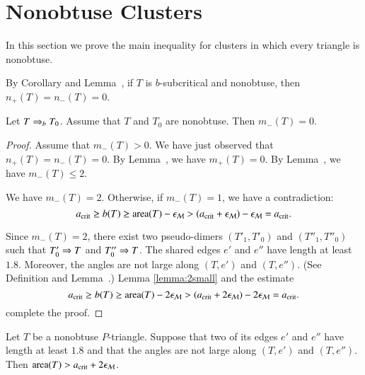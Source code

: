 \section{Nonobtuse Clusters}

In this section we prove the main inequality for clusters in which every
triangle is nonobtuse.

By Corollary  and Lemma~, 
if $T$ is $b$-subcritical and nonobtuse, then $n_+(T)=n_-(T)=0$.


\begin{lemma} 
  Let $T\Rightarrow_{b} T_0$. Assume that $T$ and $T_0$ are nonobtuse.  Then
  $m_-(T)=0$.
\end{lemma}

\begin{proof}  
  Assume that $m_-(T)>0$.  We have just observed that
  $n_+(T)=n_-(T)=0$.  By Lemma~, we have $m_+(T)=0$.
  By Lemma~, we have $m_-(T)\le 2$.


  We have $m_-(T)=2$.  Otherwise, if $m_-(T)=1$, we have a
  contradiction:
\[
a_\text{crit} \ge b(T) \ge {\operatorname{area}}(T) - \epsilon_{\mathcal M} > (a_\text{crit} + \epsilon_{\mathcal M}) - \epsilon_{\mathcal M} = a_\text{crit}.
\]

Since $m_-(T)=2$, there exist two pseudo-dimers $(T'_1,T'_0)$ and
$(T''_1,T''_0)$ such that $T'_0\Rightarrow T$ and $T''_0\Rightarrow T$.  The shared
edges $e'$ and $e''$ have length at least $1.8$.  Moreover, the angles
are not large along $(T,e')$ and $(T,e'')$.  (See Definition
 and Lemma~.)  Lemma
\ref{lemma:2small} and the estimate
\[
a_\text{crit} \ge b(T) \ge {\operatorname{area}}(T) - 2\epsilon_{\mathcal M} 
> (a_\text{crit} + 2\epsilon_{\mathcal M}) - 2\epsilon_{\mathcal M} = a_\text{crit}.
\]
complete the proof.
\end{proof}

\begin{lemma} \label{lemma:2small}
  Let $T$ be a nonobtuse $P$-triangle.  Suppose that two of its edges
  $e'$ and $e''$ have length at least $1.8$ and that the angles are
  not large along $(T,e')$ and $(T,e'')$.  Then ${\operatorname{area}}(T) > a_\text{crit} +
  2\epsilon_{\mathcal M}$.
\end{lemma}

